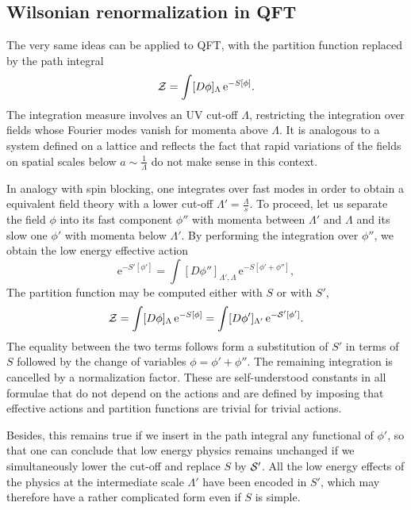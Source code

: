 \documentclass[10pt,here,feynmf]{article}
\begin{document}
\subsection{Wilsonian renormalization in QFT }


The very same ideas can be applied to QFT, with the partition function replaced by the path integral
\begin{equation}
{\cal Z}=\int[D\phi]_{\Lambda}\,\mathrm{e}^{-S[\phi]}.
\end{equation}   
The integration  measure involves an UV cut-off $\Lambda$, restricting the integration over fields whose Fourier modes vanish for momenta above $\Lambda$. It is analogous to a system defined on a lattice and reflects the fact that rapid variations of the fields on spatial scales below $a\sim\frac{1}{\Lambda}$ do not make sense in this context.  

In analogy with spin blocking, one integrates over fast modes in order to obtain a equivalent field theory with a lower cut-off $\Lambda'=\frac{\Lambda}{s}$. To proceed, let us separate the field $\phi$ into its fast component $\phi''$ with momenta between $\Lambda'$ and $\Lambda$ and its slow one $\phi'$ with momenta below $\Lambda'$. By performing the integration over $\phi''$, we obtain the low energy effective action 
\begin{equation}
\mathrm{e}^{-S'[\phi']}=\int[D\phi'']_{\Lambda',\Lambda}\,
\mathrm{e}^{-S[\phi'+\phi'']},
\end{equation}
The partition function may be computed either with $S$ or with $S'$,
\begin{equation}
{\cal Z}=\int[D\phi]_{\Lambda}\,\mathrm{e}^{-S[\phi]}=
\int[D\phi']_{\Lambda'}\,\mathrm{e}^{-{\cal S'}[\phi']}.
\end{equation}
The equality between the two terms follows form a substitution of $S'$ in terms of $S$ followed by the change of variables $\phi=\phi'+\phi''$. The remaining integration is cancelled by a normalization factor. These are self-understood constants in all formulae that do not depend on the actions and are defined by imposing that effective actions and partition functions are trivial for trivial actions. 

Besides, this remains true if we insert in the path integral any functional of $\phi'$, so that one can conclude that low energy  physics remains unchanged if we simultaneously lower the cut-off and replace $S$ by ${\cal S'}$. All the low energy effects of the physics at the intermediate scale  $\Lambda'$ have been encoded in $S'$, which may therefore have a rather complicated form even if $S$ is simple. 
\end{document}
